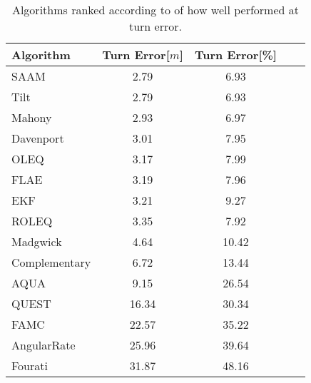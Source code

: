 \begin{table}[H]
    \begin{center}
        \begin{tabular}[t]{lcccc}
            \hline
            Algorithm     & Turn Error[$m$] & Turn Error[\%] \\
            \hline
            SAAM          & 2.79            & 6.93           \\
            Tilt          & 2.79            & 6.93           \\
            Mahony        & 2.93            & 6.97           \\
            Davenport     & 3.01            & 7.95           \\
            OLEQ          & 3.17            & 7.99           \\
            FLAE          & 3.19            & 7.96           \\
            EKF           & 3.21            & 9.27           \\
            ROLEQ         & 3.35            & 7.92           \\
            Madgwick      & 4.64            & 10.42          \\
            Complementary & 6.72            & 13.44          \\
            AQUA          & 9.15            & 26.54          \\
            QUEST         & 16.34           & 30.34          \\
            FAMC          & 22.57           & 35.22          \\
            AngularRate   & 25.96           & 39.64          \\
            Fourati       & 31.87           & 48.16          \\
        \end{tabular}
        \caption{ Algorithms ranked according to of how well performed at turn error. }
        \label{tab:ranked_turn}
    \end{center}
\end{table}